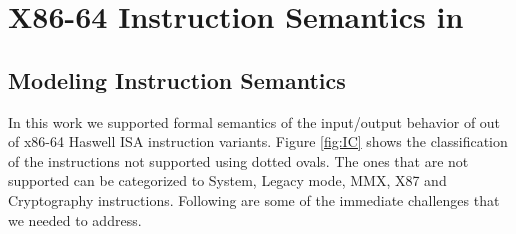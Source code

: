 
\section{X86-64 Instruction Semantics in \K} \label{sec:modelI}

\subsection{Modeling Instruction Semantics}


In this work we supported formal semantics of the input/output behavior of
\supp{} out of \total{} x86-64 Haswell ISA instruction variants. Figure \ref{fig:IC} shows the classification of the instructions not supported using dotted ovals. The ones that are not supported can be categorized to System, Legacy mode, MMX, X87 and Cryptography instructions. Following are some of the immediate challenges that we needed to address.

